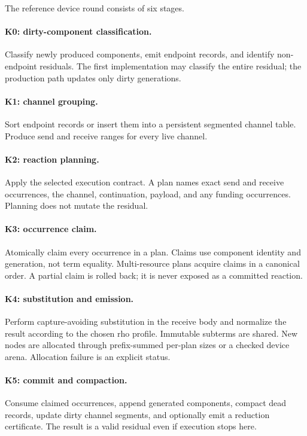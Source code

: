 \documentclass[11pt]{article}
\begin{document}
The reference device round consists of six stages.

\paragraph{K0: dirty-component classification.}
Classify newly produced components, emit endpoint records, and identify
non-endpoint residuals.  The first implementation may classify the entire
residual; the production path updates only dirty generations.

\paragraph{K1: channel grouping.}
Sort endpoint records or insert them into a persistent segmented channel
table.  Produce send and receive ranges for every live channel.

\paragraph{K2: reaction planning.}
Apply the selected execution contract.  A plan names exact send and receive
occurrences, the channel, continuation, payload, and any funding occurrences.
Planning does not mutate the residual.

\paragraph{K3: occurrence claim.}
Atomically claim every occurrence in a plan.  Claims use component identity
and generation, not term equality.  Multi-resource plans acquire claims in a
canonical order.  A partial claim is rolled back; it is never exposed as a
committed reaction.

\paragraph{K4: substitution and emission.}
Perform capture-avoiding substitution in the receive body and normalize the
result according to the chosen rho profile.  Immutable subterms are shared.
New nodes are allocated through prefix-summed per-plan sizes or a checked
device arena.  Allocation failure is an explicit status.

\paragraph{K5: commit and compaction.}
Consume claimed occurrences, append generated components, compact dead
records, update dirty channel segments, and optionally emit a reduction
certificate.  The result is a valid residual even if execution stops here.
\end{document}
